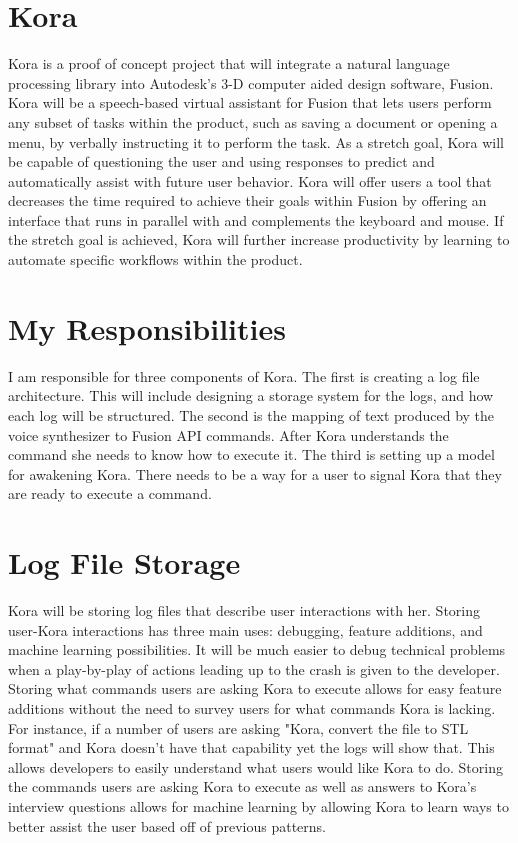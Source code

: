 \documentclass[onecolumn, draftclsnofoot,10pt, compsoc]{IEEEtran}
\begin{document}
	\section{Kora}
		Kora is a proof of concept project that will integrate a natural language processing library into Autodesk's 3-D computer aided design software, Fusion.
		Kora will be a speech-based virtual assistant for Fusion that lets users perform any subset of tasks within the product, such as saving a document or opening a menu, by verbally instructing it to perform the task.
		As a stretch goal, Kora will be capable of questioning the user and using responses to predict and automatically assist with future user behavior.
		Kora will offer users a tool that decreases the time required to achieve their goals within Fusion by offering an interface that runs in parallel with and complements the keyboard and mouse.
		If the stretch goal is achieved, Kora will further increase productivity by learning to automate specific workflows within the product.
		
		
	\section{My Responsibilities}
		I am responsible for three components of Kora.
		The first is creating a log file architecture.
		This will include designing a storage system for the logs, and how each log will be structured.
		The second is the mapping of text produced by the voice synthesizer to Fusion API commands.
		After Kora understands the command she needs to know how to execute it.
		The third is setting up a model for awakening Kora.
		There needs to be a way for a user to signal Kora that they are ready to execute a command.
		
		
	\section{Log File Storage}
		Kora will be storing log files that describe user interactions with her.
		Storing user-Kora interactions has three main uses: debugging, feature additions, and machine learning possibilities.
		It will be much easier to debug technical problems when a play-by-play of actions leading up to the crash is given to the developer.
		Storing what commands users are asking Kora to execute allows for easy feature additions without the need to survey users for what commands Kora is lacking.
		For instance, if a number of users are asking "Kora, convert the file to STL format" and Kora doesn't have that capability yet the logs will show that.
		This allows developers to easily understand what users would like Kora to do.
		Storing the commands users are asking Kora to execute as well as answers to Kora's interview questions allows for machine learning by allowing Kora to learn ways to better assist the user based off of previous patterns.
\end{document}
